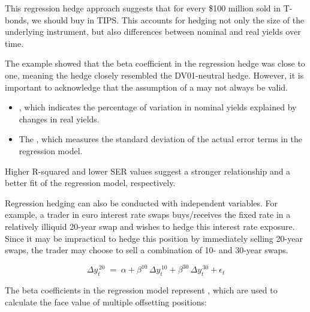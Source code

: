 This regression hedge approach suggests that for every \$100 million sold in T-bonds, we should
buy  in TIPS. This accounts for hedging not only the size of the
underlying instrument, but also differences between nominal and real yields over time.

The example showed that the beta coefficient in the regression hedge was close to one, meaning
the hedge closely resembled the DV01-neutral hedge. However, it is important to acknowledge that
the assumption of a  may not always be valid.

\begin{mrkeybox}[title={Other factors to consider}]
\begin{itemize}
\item {}, which indicates the percentage of variation in nominal yields explained
      by changes in real yields.
\item The , which measures the standard deviation
      of the actual error terms in the regression model.
\end{itemize}
\medskip
Higher R-squared and lower SER values suggest a stronger relationship and a better fit of the
regression model, respectively.
\end{mrkeybox}


Regression hedging can also be conducted with  independent variables. For example, a
trader in euro interest rate swaps buys/receives the fixed rate in a relatively illiquid 20-year
swap and wishes to hedge this interest rate exposure. Since it may be impractical to hedge this
position by immediately selling 20-year swaps, the trader may choose to sell a combination of
10- and 30-year swaps.

\begin{mrfmlbox}
\[ \Delta y_t^{\,20} \;=\; \alpha + \beta^{10}\, \Delta y_t^{\,10}
   + \beta^{30}\, \Delta y_t^{\,30} + \epsilon_t \]
\end{mrfmlbox}

The beta coefficients in the regression model represent , which are used to
calculate the face value of multiple offsetting positions:

